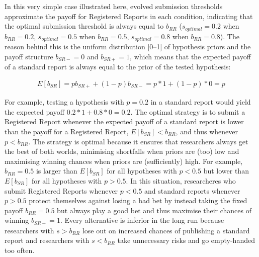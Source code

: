 \documentclass[british,,doc,mask,floatsintext]{apa6}
\begin{document}
In this very simple case illustrated here, evolved submission thresholds approximate the payoff for Registered Reports in each condition, indicating that the optimal submission threshold is always equal to \(b_{RR}\) (\(s_{optimal} = 0.2\) when \(b_{RR} = 0.2\), \(s_{optimal} = 0.5\) when \(b_{RR} = 0.5\), \(s_{optimal} = 0.8\) when \(b_{RR} = 0.8\)).
The reason behind this is the uniform distribution {[}0--1{]} of hypothesis priors and the payoff structure \(b_{SR-} = 0\) and \(b_{SR+} = 1\), which means that the expected payoff of a standard report is always equal to the prior of the tested hypothesis:

\begin{align}
E[b_{SR}] = p b_{SR+} + (1-p)b_{SR-} = p * 1 +  (1-p) * 0 = p
\end{align}

For example, testing a hypothesis with \(p = 0.2\) in a standard report would yield the expected payoff \(0.2 * 1 + 0.8 * 0 = 0.2\).
The optimal strategy is to submit a Registered Report whenever the expected payoff of a standard report is lower than the payoff for a Registered Report, \(E[b_{SR}] < b_{RR}\), and thus whenever \(p < b_{RR}\).
The strategy is optimal because it ensures that researchers always get the best of both worlds, minimising shortfalls when priors are (too) low and maximising winning chances when priors are (sufficiently) high.
For example, \(b_{RR} = 0.5\) is larger than \(E[b_{SR}]\) for all hypotheses with \(p < 0.5\) but lower than \(E[b_{SR}]\) for all hypotheses with \(p > 0.5\).
In this situation, researcheres who submit Registered Reports whenever \(p<0.5\) and standard reports whenever \(p>0.5\) protect themselves against losing a bad bet by instead taking the fixed payoff \(b_{RR} = 0.5\) but always play a good bet and thus maximise their chances of winning \(b_{SR+} = 1\).
Every alternative is inferior in the long run because researchers with \(s > b_{RR}\) lose out on increased chances of publishing a standard report and researchers with \(s < b_{RR}\) take unnecessary risks and go empty-handed too often.
\end{document}
